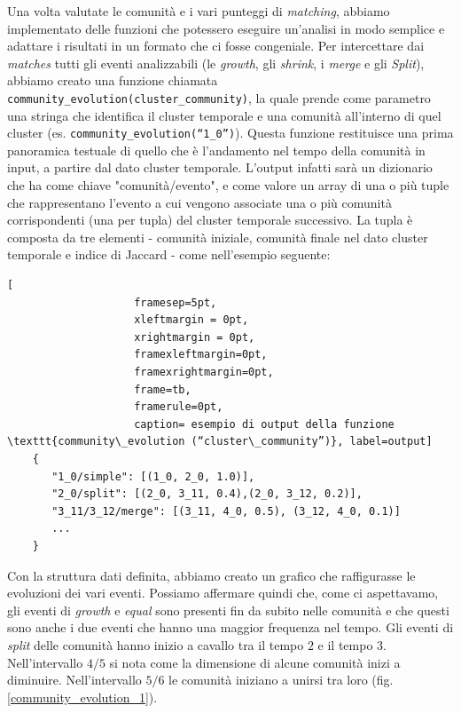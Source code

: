     Una volta valutate le comunità e i vari punteggi di \textit{matching}, abbiamo implementato delle funzioni che potessero eseguire un'analisi in modo semplice e adattare i risultati in un formato che ci fosse congeniale. Per intercettare dai \textit{matches} tutti gli eventi analizzabili (le \textit{growth}, gli \textit{shrink}, i \textit{merge} e gli \textit{Split}), abbiamo creato una funzione chiamata \texttt{community\_evolution(cluster\_community)}, la quale prende come parametro una stringa che identifica il cluster temporale e una comunità all’interno di quel cluster (es. \texttt{community\_evolution(“1\_0”)}). Questa funzione restituisce una prima panoramica testuale di quello che è l’andamento nel tempo della comunità in input, a partire dal dato cluster temporale. L'output infatti sarà un dizionario che ha come chiave "comunità/evento", e come valore un array di una o più tuple che rappresentano l'evento a cui vengono associate una o più comunità corrispondenti (una per tupla) del cluster temporale successivo. La tupla è composta da tre elementi - comunità iniziale, comunità finale nel dato cluster temporale e indice di Jaccard - come nell'esempio seguente:
    
    \begin{lstlisting}[
                    framesep=5pt,
                    xleftmargin = 0pt,
                    xrightmargin = 0pt,
                    framexleftmargin=0pt,
                    framexrightmargin=0pt,
                    frame=tb,
                    framerule=0pt,
                    caption= esempio di output della funzione \texttt{community\_evolution (“cluster\_community”)}, label=output]
    {
       "1_0/simple": [(1_0, 2_0, 1.0)],
       "2_0/split": [(2_0, 3_11, 0.4),(2_0, 3_12, 0.2)],
       "3_11/3_12/merge": [(3_11, 4_0, 0.5), (3_12, 4_0, 0.1)]
       ...
    }
    \end{lstlisting}

    Con la struttura dati definita, abbiamo creato un grafico che raffigurasse le evoluzioni dei vari eventi. 
    Possiamo affermare quindi che, come ci aspettavamo, gli eventi di \textit{growth} e \textit{equal} sono presenti fin da subito nelle comunità e che questi sono anche i due eventi che hanno una maggior frequenza nel tempo. Gli eventi di \textit{split} delle comunità hanno inizio a cavallo tra il tempo $2$ e il tempo $3$. Nell'intervallo $4/5$ si nota come la dimensione di alcune comunità inizi a diminuire. Nell'intervallo $5/6$ le comunità iniziano a unirsi tra loro (fig. \ref{community_evolution_1}).
    

